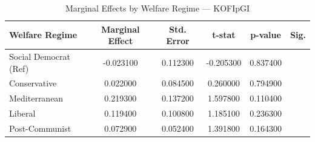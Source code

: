\begin{table}[htbp]
\caption{Marginal Effects by Welfare Regime — KOFIpGI}
\label{tab:marginal_effects_KOFIpGI}
\begin{tabular}{lccccc}
\toprule
Welfare Regime & Marginal Effect & Std. Error & t-stat & p-value & Sig. \\
\midrule
Social Democrat (Ref) & -0.023100 & 0.112300 & -0.205300 & 0.837400 &  \\
Conservative & 0.022000 & 0.084500 & 0.260000 & 0.794900 &  \\
Mediterranean & 0.219300 & 0.137200 & 1.597800 & 0.110400 &  \\
Liberal & 0.119400 & 0.100800 & 1.185100 & 0.236300 &  \\
Post-Communist & 0.072900 & 0.052400 & 1.391800 & 0.164300 &  \\
\bottomrule
\end{tabular}
\end{table}
